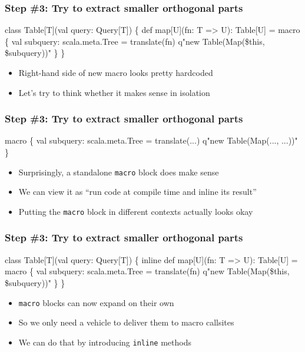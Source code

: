 \documentclass[svgnames,dvipsnames,hyperref={bookmarks=false},usepdftitle=false]{beamer}
\begin{document}
\begin{frame}[fragile]
\frametitle{Step \#3: Try to extract smaller orthogonal parts}
\begin{semiverbatim}
class Table[T](val query: Query[T]) \{
  def map[U](fn: T => U): Table[U] = \alert{macro \{}
    \alert{val subquery: scala.meta.Tree = translate(fn)}
    \alert{q"new Table(Map(\$this, \$subquery))"}
  \alert{\}}
\}

\end{semiverbatim}
\begin{itemize}
\item Right-hand side of new macro looks pretty hardcoded
\item Let's try to think whether it makes sense in isolation
\end{itemize}
\end{frame}

\begin{frame}[fragile]
\frametitle{Step \#3: Try to extract smaller orthogonal parts}
\begin{semiverbatim}

  macro \{
    val subquery: scala.meta.Tree = translate(...)
    q"new Table(Map(..., ...))"
  \}


\end{semiverbatim}
\begin{itemize}
\item Surprisingly, a standalone \texttt{macro} block does make sense
\item We can view it as ``run code at compile time and inline its result''
\item<2-> Putting the \texttt{macro} block in different contexts actually looks okay
\end{itemize}
\end{frame}

\begin{frame}[fragile]
\frametitle{Step \#3: Try to extract smaller orthogonal parts}
\begin{semiverbatim}
class Table[T](val query: Query[T]) \{
  \alert{inline} def map[U](fn: T => U): Table[U] = macro \{
    val subquery: scala.meta.Tree = translate(fn)
    q"new Table(Map(\$this, \$subquery))"
  \}
\}

\end{semiverbatim}
\begin{itemize}
\item \texttt{macro} blocks can now expand on their own
\item So we only need a vehicle to deliver them to macro callsites
\item We can do that by introducing \texttt{inline} methods
\end{itemize}
\end{frame}
\end{document}
